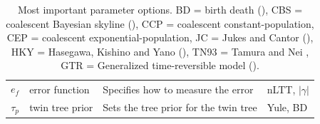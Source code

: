 \documentclass{article}
\begin{document}
\begin{table}
\begin{tabular}{|@{}c|p{2.5cm}|p{9cm}|p{4.5cm}@{}|}
    $\mathit{e_{f}}$ & error function & Specifies how to measure the error 
      & nLTT, $|\gamma|$ \\
    $\mathit{\tau_{p}}$ & twin tree prior 
      & Sets the tree prior for the twin tree 
      & Yule, BD \\
    \hline
  \end{tabular}
  \caption{
    Most important parameter options.
    BD = birth death (\cite{nee1994reconstructed}), 
    CBS = coalescent Bayesian skyline (\cite{drummond2005bayesian}), 
    CCP = coalescent constant-population, 
    CEP = coalescent exponential-population,
    JC = Jukes and Cantor (\cite{jukes1969evolution}), 
    HKY = Hasegawa, Kishino and Yano (\cite{hasegawa1985dating}), 
    TN93 = Tamura and Nei \cite{tamura1993estimation}, 
    GTR = Generalized time-reversible model (\cite{tavare1986some}).
  }
  \label{tab:options}
\bigskip


\end{table}
\end{document}
